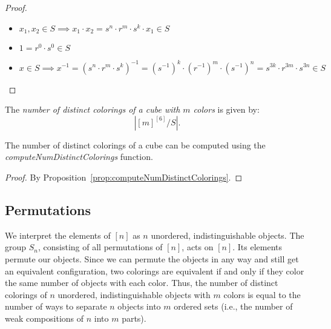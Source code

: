 \begin{proof}
  \leanok
  \begin{itemize}
    \item $x_1, x_2 \in S \implies x_1 \cdot x_2 = s^n \cdot r^m \cdot s^k \cdot x_1 \in S$

    \item $1 = r^0 \cdot s^0 \in S$

    \item $x \in S \implies x^{-1} = (s^n \cdot r^m \cdot s^k)^{-1} = (s^{-1})^k \cdot (r^{-1})^m \cdot (s^{-1})^n = s^{3k} \cdot r^{3m} \cdot s^{3n} \in S$
  \end{itemize}
\end{proof}

\begin{definition}
  \label{def:numDistinctColoringsOfCube}
  \leanok
  The \emph{number of distinct colorings of a cube with $m$ colors} is given by:
  \begin{equation*}
    |[m]^{[6]} / S|.
  \end{equation*}
\end{definition}

\begin{proposition}
  \label{prop:computeNumDistinctColoringsOfCube-eq-numDistinctColoringsOfCube}
  \leanok
  The number of distinct colorings of a cube can be computed using the \emph{computeNumDistinctColorings} function.
\end{proposition}

\begin{proof}
  \leanok
  By Proposition~\ref{prop:computeNumDistinctColorings}.
\end{proof}

\subsection{Permutations}

We interpret the elements of $[n]$ as $n$ unordered, indistinguishable objects. The group $S_n$, consisting of all permutations of $[n]$, acts on $[n]$. Its elements permute our objects. Since we can permute the objects in any way and still get an equivalent configuration, two colorings are equivalent if and only if they color the same number of objects with each color. Thus, the number of distinct colorings of $n$ unordered, indistinguishable objects with $m$ colors is equal to the number of ways to separate $n$ objects into $m$ ordered sets (i.e., the number of weak compositions of $n$ into $m$ parts). 

